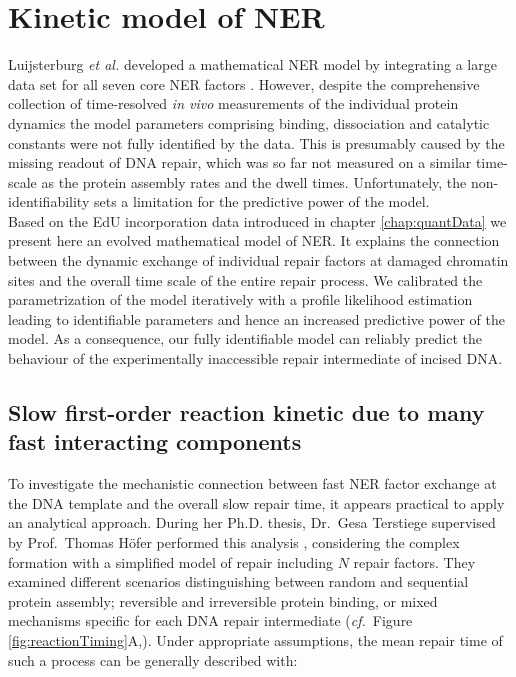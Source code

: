 \chapter{Kinetic model of NER}
\label{chap:kineticNERmodel}

Luijsterburg \textit{et al.} developed a mathematical NER model by integrating a large data set for all seven core NER factors \cite{Luijsterburg2010}. However, despite the comprehensive collection of time-resolved \textit{in vivo} measurements of the individual protein dynamics the model parameters comprising binding, dissociation and catalytic constants were not fully identified by the data. This is presumably caused by the missing readout of DNA repair, which was so far not measured on a similar time-scale as the protein assembly rates and the dwell times. Unfortunately, the non-identifiability sets a limitation for the predictive power of the model. \\ 
Based on the EdU incorporation data introduced in chapter \ref{chap:quantData} we present here an evolved mathematical model of NER. It explains the connection between the dynamic exchange of individual repair factors at damaged chromatin sites and the overall time scale of the entire repair process. We calibrated the parametrization of the model iteratively with a profile likelihood estimation leading to identifiable parameters and hence an increased predictive power of the model. As a consequence, our fully identifiable model can reliably predict the behaviour of the experimentally inaccessible repair intermediate of incised DNA.\\
   



\section{Slow first-order reaction kinetic due to many fast interacting components}
\label{sec:toyModel}
To investigate the mechanistic connection between fast NER factor exchange at the DNA template and the overall slow repair time, it appears practical to apply an analytical approach. During her Ph.D. thesis, Dr.\ Gesa Terstiege supervised by Prof.\ Thomas H\"ofer performed this analysis \cite{Terstiege2010,Verbruggen2014}, considering the complex formation with a simplified model of repair including $N$ repair factors. They examined different scenarios distinguishing between random and sequential protein assembly; reversible and irreversible protein binding, or mixed mechanisms specific for each DNA repair intermediate (\textit{cf.}\ Figure \ref{fig:reactionTiming}A,\cite{Verbruggen2014}). Under appropriate assumptions, the mean repair time of such a process can be generally described with:

